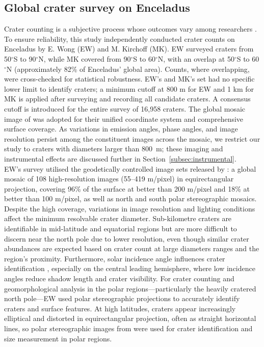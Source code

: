 \documentclass[preprint,11pt,3p,times,authoryear]{elsarticle}
\begin{document}
\subsection{Global crater survey on Enceladus}
\label{subsec:survey}
Crater counting is a subjective process whose outcomes vary among researchers \citep{Robbins2014}. To ensure reliability, this study independently conducted crater counts on Enceladus by E. Wong (EW) and M. Kirchoff (MK). EW surveyed craters from 50$^\circ$S to 90$^\circ$N, while MK covered from 90$^\circ$S to 60$^\circ$N, with an overlap at 50$^\circ$S to 60$^\circ$N (approximately 82\% of Enceladus' global area). Counts, where overlapping, were cross-checked for statistical robustness. EW’s and MK’s set had no specific lower limit to identify craters; a minimum cutoff at 800 m for EW and 1 km for MK is applied after surveying and recording all candidate craters. A consensus cutoff is introduced for the entire survey of 16,958 craters. 
The global mosaic image of \citet{Bland2018} was adopted for their unified coordinate system and comprehensive surface coverage. As variations in emission angles, phase angles, and image resolution persist among the constituent images across the mosaic, we restrict our study to craters with diameters larger than 800~m; these imaging and instrumental effects are discussed further in Section~\ref{subsec:instrumental}.\\

EW’s survey utilised the geodetically controlled image sets released by \citet{Bland2018}: a global mosaic of 108 high-resolution images (55–419 m/pixel) in equirectangular projection, covering 96\% of the surface at better than 200 m/pixel and 18\% at better than 100 m/pixel, as well as north and south polar stereographic mosaics. Despite the high coverage, variations in image resolution and lighting conditions affect the minimum resolvable crater diameter. Sub-kilometre craters are identifiable in mid-latitude and equatorial regions but are more difficult to discern near the north pole due to lower resolution, even though similar crater abundances are expected based on crater count at large diameters ranges and the region's proximity. Furthermore, solar incidence angle influences crater identification \citep{Ostrach2011, Robbins2025}, especially on the central leading hemisphere, where low incidence angles reduce shadow length and crater visibility. For crater counting and geomorphological analysis in the polar regions—particularly the heavily cratered north pole—EW used polar stereographic projections to accurately identify craters and surface features. At high latitudes, craters appear increasingly elliptical and distorted in equirectangular projection, often as straight horizontal lines, so polar stereographic images from \citet{Bland2018} were used for crater identification and size measurement in polar regions.\\
\end{document}
